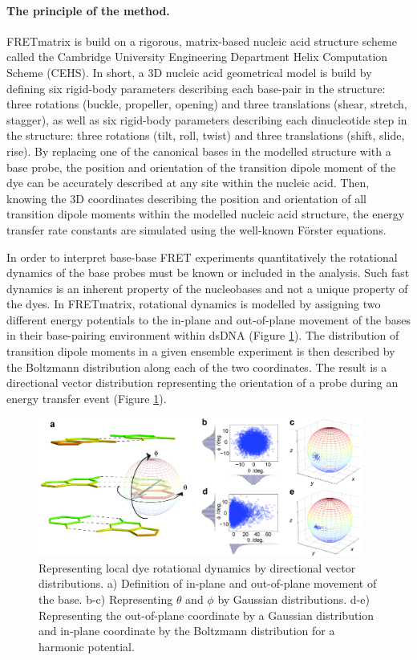  \paragraph{The principle of the method.} FRETmatrix is build on a rigorous, matrix-based nucleic acid structure scheme called the Cambridge University Engineering Department Helix Computation Scheme (CEHS). In short, a 3D nucleic acid geometrical model is build by defining six rigid-body parameters describing each base-pair in the structure: three rotations (buckle, propeller, opening) and three translations (shear, stretch, stagger), as well as six rigid-body parameters describing each dinucleotide step in the structure: three rotations (tilt, roll, twist) and three translations (shift, slide, rise). By replacing one of the canonical bases in the modelled structure with a base probe, the position and orientation of the transition dipole moment of the dye can be accurately described at any site within the nucleic acid. Then, knowing the 3D coordinates describing the position and orientation of all transition dipole moments within the modelled nucleic acid structure, the energy transfer rate constants are simulated using the well-known Förster equations.

 In order to interpret base-base FRET experiments quantitatively the rotational dynamics of the base probes must be known or included in the analysis. Such fast dynamics is an inherent property of the nucleobases and not a unique property of the dyes. In FRETmatrix, rotational dynamics is modelled by assigning two different energy potentials to the in-plane and out-of-plane movement of the bases in their base-pairing environment within dsDNA (Figure \ref{Fig:chap_Papers_NAR}). The distribution of transition dipole moments in a given ensemble experiment is then described by the Boltzmann distribution along each of the two coordinates. The result is a directional vector distribution representing the orientation of a probe during an energy transfer event (Figure \ref{Fig:chap_Papers_NAR}).

\begin{figure}
    \centering
        \includegraphics[width=0.95\textwidth]{adds//nar_fig.png}
    \captionsetup{width=.95\textwidth}
    \caption{Representing local dye rotational dynamics by directional vector distributions. a) Definition of in-plane and out-of-plane movement of the base. b-c) Representing $\theta$ and $\phi$ by Gaussian distributions. d-e) Representing the out-of-plane coordinate by a Gaussian distribution and in-plane coordinate by the Boltzmann distribution for a harmonic potential.}
    \label{Fig:chap_Papers_NAR}
\end{figure}

